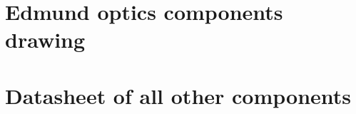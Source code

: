 \chapter{Edmund optics components drawing} \label{App:Edmund_MEP}

\newpage

\newpage

\newpage

\newpage

\newpage

\chapter{Datasheet of all other components}

\newpage
